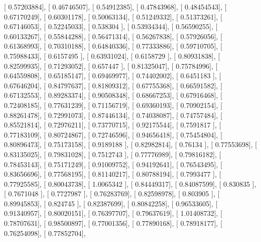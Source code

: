\documentclass{article}
\begin{document}
       [ 0.57203884],
       [ 0.46746507],
       [ 0.54912385],
       [ 0.47843968],
       [ 0.48454543],
       [ 0.67170249],
       [ 0.60301178],
       [ 0.50063134],
       [ 0.51249332],
       [ 0.51373261],
       [ 0.67146053],
       [ 0.52245033],
       [ 0.538304  ],
       [ 0.53934344],
       [ 0.56590255],
       [ 0.60133267],
       [ 0.55844288],
       [ 0.56471314],
       [ 0.56267838],
       [ 0.57926056],
       [ 0.61368993],
       [ 0.70310188],
       [ 0.64840336],
       [ 0.77333886],
       [ 0.59710705],
       [ 0.75988433],
       [ 0.6157495 ],
       [ 0.63931024],
       [ 0.6158729 ],
       [ 0.80931838],
       [ 0.82599935],
       [ 0.71293052],
       [ 0.657447  ],
       [ 0.81325047],
       [ 0.75784996],
       [ 0.64559808],
       [ 0.65185147],
       [ 0.69469977],
       [ 0.74402002],
       [ 0.6451183 ],
       [ 0.67646204],
       [ 0.84797637],
       [ 0.81809312],
       [ 0.67755368],
       [ 0.66591582],
       [ 0.67132553],
       [ 0.89283374],
       [ 0.90508348],
       [ 0.68667253],
       [ 0.67916468],
       [ 0.72408185],
       [ 0.77631239],
       [ 0.71156719],
       [ 0.69360193],
       [ 0.70902154],
       [ 0.88261478],
       [ 0.72991073],
       [ 0.87446134],
       [ 0.74038087],
       [ 0.74757484],
       [ 0.85521814],
       [ 0.72976211],
       [ 0.73770715],
       [ 0.92175544],
       [ 0.7591817 ],
       [ 0.77183109],
       [ 0.80724867],
       [ 0.72746596],
       [ 0.94656418],
       [ 0.75454804],
       [ 0.80896473],
       [ 0.75173158],
       [ 0.9189188 ],
       [ 0.82982814],
       [ 0.76134   ],
       [ 0.77553698],
       [ 0.83135025],
       [ 0.79831028],
       [ 0.7512743 ],
       [ 0.77776989],
       [ 0.79816182],
       [ 0.78453143],
       [ 0.75171249],
       [ 0.91009752],
       [ 0.94192641],
       [ 0.76543495],
       [ 0.83656696],
       [ 0.77568195],
       [ 0.81140217],
       [ 0.80788194],
       [ 0.7993477 ],
       [ 0.77925585],
       [ 0.80043738],
       [ 1.0065342 ],
       [ 0.84449317],
       [ 0.84087599],
       [ 0.830835  ],
       [ 0.7671048 ],
       [ 0.7727987 ],
       [ 0.76283769],
       [ 0.82598978],
       [ 0.803905  ],
       [ 0.89945853],
       [ 0.824745  ],
       [ 0.82387699],
       [ 0.80842258],
       [ 0.96533605],
       [ 0.91340957],
       [ 0.80020151],
       [ 0.76397707],
       [ 0.79637619],
       [ 1.01408732],
       [ 0.78707631],
       [ 0.98500897],
       [ 0.77001356],
       [ 0.77890168],
       [ 0.78918177],
       [ 0.76254098],
       [ 0.77852704],
\end{document}
